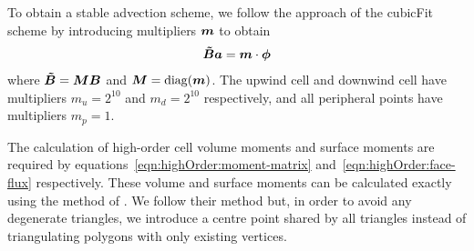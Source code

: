 To obtain a stable advection scheme, we follow the approach of the cubicFit scheme by introducing multipliers $\bm{m}$ to obtain
\begin{align}
	\bm{\tilde{B}} \bm{a} = \bm{m} \cdot \bm{\phi}
\end{align}
where $\bm{\tilde{B}} = \bm{M} \bm{B}$ and $\bm{M} = \mathrm{diag}(\bm{m})$.
The upwind cell and downwind cell have multipliers $m_u = 2^{10}$ and $m_d = 2^{10}$ respectively, and all peripheral points have multipliers $m_p = 1$.

The calculation of high-order cell volume moments and surface moments are required by equations~\eqref{eqn:highOrder:moment-matrix} and~\eqref{eqn:highOrder:face-flux} respectively.  These volume and surface moments can be calculated exactly using the method of \citet{tuzikov2003}.
We follow their method but, in order to avoid any degenerate triangles, we introduce a centre point shared by all triangles instead of triangulating polygons with only existing vertices.


